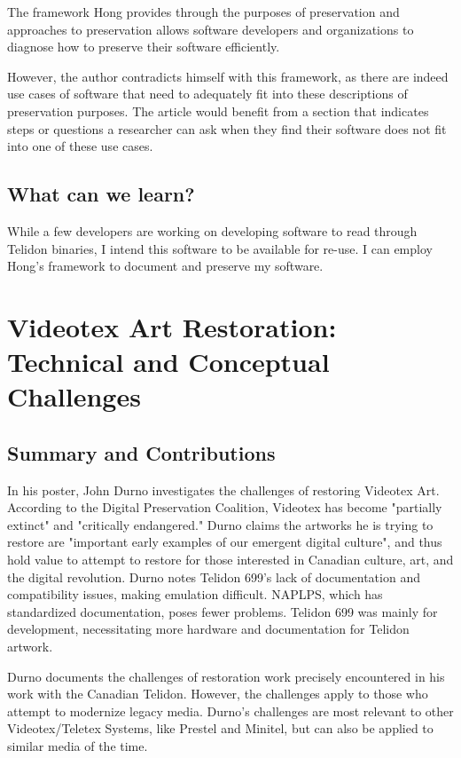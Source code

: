 \documentclass[sigconf]{acmart}
\begin{document}
The framework Hong provides through the purposes of preservation and approaches to preservation allows software developers and organizations to diagnose how to preserve their software efficiently.

However, the author contradicts himself with this framework, as there are indeed use cases of software that need to adequately fit into these descriptions of preservation purposes. The article would benefit from a section that indicates steps or questions a researcher can ask when they find their software does not fit into one of these use cases.

\subsection{What can we learn?}

While a few developers are working on developing software to read through Telidon binaries, I intend this software to be available for re-use. I can employ Hong's framework to document and preserve my software. 

\section{Videotex Art Restoration: Technical and Conceptual Challenges}


\subsection{Summary and Contributions}

In his poster, John Durno investigates the challenges of restoring Videotex Art. According to the Digital Preservation Coalition, Videotex has become "partially extinct" and "critically endangered." Durno claims the artworks he is trying to restore are "important early examples of our emergent digital culture", and thus hold value to attempt to restore for those interested in Canadian culture, art, and the digital revolution. Durno notes Telidon 699's lack of documentation and compatibility issues, making emulation difficult. NAPLPS, which has standardized documentation, poses fewer problems. Telidon 699 was mainly for development, necessitating more hardware and documentation for Telidon artwork.

Durno documents the challenges of restoration work precisely encountered in his work with the Canadian Telidon. However, the challenges apply to those who attempt to modernize legacy media. Durno's challenges are most relevant to other Videotex/Teletex Systems, like Prestel and Minitel, but can also be applied to similar media of the time. 
\end{document}
